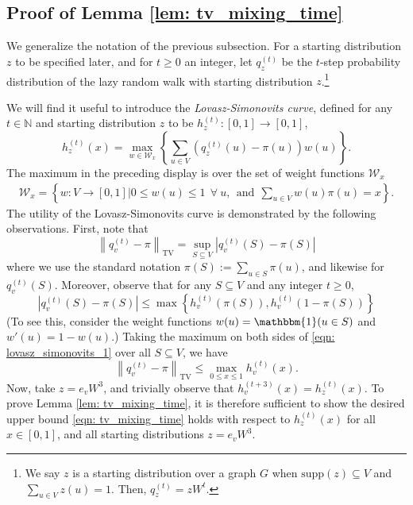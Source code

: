 \documentclass[11pt,twoside]{article}
\newcommand{\set}[1]{\left\{#1\right\}}
\newcommand{\abs}[1]{\left \lvert #1 \right \rvert}
\newcommand{\norm}[1]{\left\lVert#1\right\rVert}
\newcommand{\1}{\mathbbm{1}}
\begin{document}
\subsection{Proof of Lemma \ref{lem: tv_mixing_time}}
\label{sec: mixing_time_on_graphs}

We generalize the notation of the previous subsection. For a starting distribution $z$ to be specified later, and for $t \geq 0$ an integer, let $q_z^{(t)}$ be the $t$-step probability distribution of the lazy random walk with starting distribution $z$.\footnote{We say $z$ is a starting distribution over a graph $G$ when $\textrm{supp}(z) \subseteq V$ and $\sum_{u \in V}z(u) = 1$. Then, $q_z^{(t)} = zW^t$.}

We will find it useful to introduce the \emph{Lovasz-Simonovits curve}, defined for any $t \in \mathbb{N}$ and starting distribution $z$ to be $h_z^{(t)}: [0,1] \to [0,1]$,
\begin{equation*}
h_z^{(t)}(x) = \max_{w \in \mathcal{W}_x} \left\{ \sum_{u \in V} \left(q_z^{(t)}(u) - \pi(u)\right)w(u)\right\}.
\end{equation*}
The maximum in the preceding display is over the set of weight functions $\mathcal{W}_{x}$
\begin{align*}
\mathcal{W}_x = \left\{w: V \to [0,1] \Big\vert 0 \leq w(u) \leq 1~~\forall~u,~~\text{and}~~\sum_{u \in V} w(u) \pi(u) = x\right\}.
\end{align*}
The utility of the Lovasz-Simonovits curve is demonstrated by the following observations. First, note that
\begin{equation*}
\norm{q_v^{(t)} - \pi}_{\mathrm{TV}} = \sup_{S \subseteq V} \abs{q_v^{(t)}(S) - \pi(S)}
\end{equation*}
where we use the standard notation $\pi(S) := \sum_{u \in S} \pi(u)$, and likewise for $q_v^{(t)}(S)$. Moreover, observe that for any $S \subseteq V$ and any integer $t \geq 0$,
\begin{equation}
\label{eqn: lovasz_simonovits_1}
\abs{q_v^{(t)}(S) - \pi(S)} \leq \max \set{h_v^{(t)}(\pi(S)), h_v^{(t)}(1 - \pi(S))}
\end{equation}
(To see this, consider the weight functions $w(u) = \1(u \in S)$ and $w'(u) = 1 - w(u)$.) Taking the maximum on both sides of \eqref{eqn: lovasz_simonovits_1}  over all $S \subseteq V$, we have
\begin{equation*}
\norm{q_v^{(t)} - \pi}_{\mathrm{TV}} \leq \max_{0 \leq x \leq 1} h_v^{(t)}(x).
\end{equation*}
Now, take $z = e_vW^3$, and trivially observe that $h_v^{(t+3)}(x) = h_z^{(t)}(x)$. To prove Lemma \ref{lem: tv_mixing_time}, it is therefore sufficient to show the desired upper bound \eqref{eqn: tv_mixing_time} holds with respect to $h_z^{(t)}(x)$ for all $x \in [0,1]$, and all starting distributions $z = e_vW^3$. 
\end{document}
